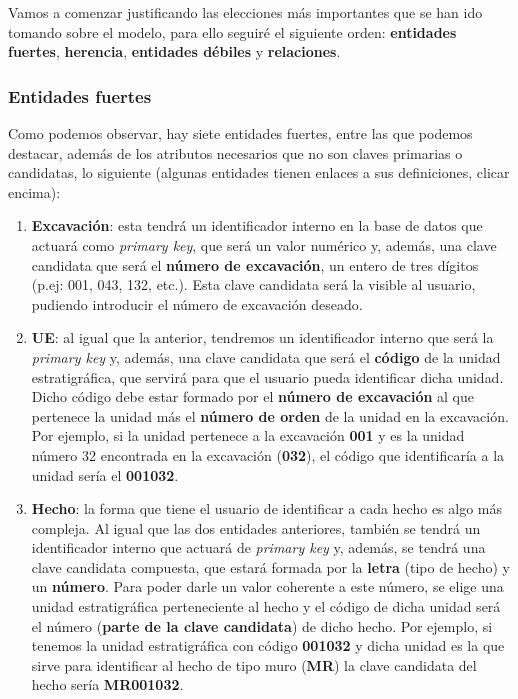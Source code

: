    Vamos a comenzar justificando las elecciones más importantes que se han ido tomando
    sobre el modelo, para ello seguiré el siguiente orden: \textbf{entidades fuertes},
    \textbf{herencia}, \textbf{entidades débiles} y \textbf{relaciones}.\\

    \subsubsection{Entidades fuertes}
    Como podemos observar, hay siete entidades fuertes, entre las que podemos destacar,
    además de los atributos necesarios que no son claves primarias o candidatas,
    lo siguiente (algunas entidades tienen enlaces a sus definiciones, clicar encima):

    \begin{enumerate}
        \item \textbf{Excavación}: esta tendrá un identificador interno en la base de
        datos que actuará como \textit{primary key}, que será un valor numérico y, además,
        una clave candidata que será el \textbf{número de excavación}, un entero de tres dígitos
        (p.ej: 001, 043, 132, etc.). Esta clave candidata será la visible al usuario, pudiendo
        introducir el número de excavación deseado.

        \item \textbf{\gls{UE}}: al igual que la anterior, tendremos un
        identificador interno que será la \textit{primary key} y, además, una clave candidata
        que será el \textbf{código} de la unidad estratigráfica, que servirá para que el
        usuario pueda identificar dicha unidad. Dicho código debe estar formado por el
        \textbf{número de excavación} al que pertenece la unidad más el \textbf{número de orden}
        de la unidad en la excavación. Por ejemplo, si la unidad pertenece a la excavación
        \textbf{001} y es la unidad número 32 encontrada en la excavación (\textbf{032}), el
        código que identificaría a la unidad sería el \textbf{001032}.

        \item \textbf{\gls{Hecho}}: la forma que tiene el usuario de identificar a cada hecho es algo
        más compleja. Al igual que las dos entidades anteriores, también se tendrá un
        identificador interno que actuará de \textit{primary key} y, además, se tendrá una clave
        candidata compuesta, que estará formada por la \textbf{letra} (tipo de hecho) y un
        \textbf{número}. Para poder darle un valor coherente a este número, se elige una
        unidad estratigráfica perteneciente al hecho y el código de dicha unidad será el
        número (\textbf{parte de la clave candidata}) de dicho hecho. Por ejemplo, si tenemos
        la unidad estratigráfica con código \textbf{001032} y dicha unidad es la que sirve
        para identificar al hecho de tipo muro (\textbf{MR}) la clave candidata del hecho
        sería \textbf{MR001032}.


\end{enumerate}
